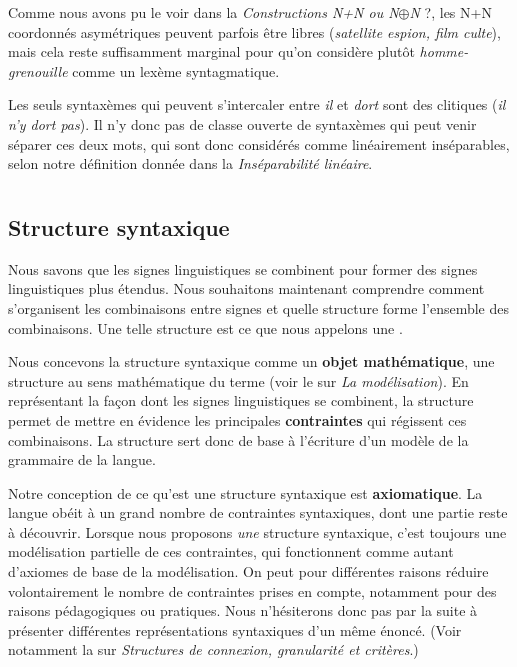 {     Comme nous avons pu le voir dans la  \textit{Constructions N+N ou N}\textrm{\textit{${\oplus}$}}\textit{N} ?, les N+N coordonnés asymétriques peuvent parfois être libres (\textit{satellite espion, film culte}), mais cela reste suffisamment marginal pour qu’on considère plutôt \textit{homme-grenouille} comme un lexème syntagmatique.

     Les seuls syntaxèmes qui peuvent s’intercaler entre \textit{il} et \textit{dort} sont des clitiques (\textit{il n’y dort pas}). Il n’y donc pas de classe ouverte de syntaxèmes qui peut venir séparer ces deux mots, qui sont donc considérés comme linéairement inséparables, selon notre définition donnée dans la  \textit{Inséparabilité linéaire}.
}
\chapter{}\label{sec:3.2}

\section{Structure syntaxique}\label{sec:3.2.0}

Nous savons que les signes linguistiques se combinent pour former des signes linguistiques plus étendus. Nous souhaitons maintenant comprendre comment s’organisent les combinaisons entre signes et quelle structure forme l’ensemble des combinaisons. Une telle structure est ce que nous appelons une .

Nous concevons la structure syntaxique comme un \textbf{objet mathématique}, une structure au sens mathématique du terme (voir le  sur \textit{La modélisation}). En représentant la façon dont les signes linguistiques se combinent, la structure permet de mettre en évidence les principales \textbf{contraintes} qui régissent ces combinaisons. La structure sert donc de base à l’écriture d’un modèle de la grammaire de la langue.

Notre conception de ce qu’est une structure syntaxique est \textbf{axiomatique}. La langue obéit à un grand nombre de contraintes syntaxiques, dont une partie reste à découvrir. Lorsque nous proposons \textit{une} structure syntaxique, c’est toujours une modélisation partielle de ces contraintes, qui fonctionnent comme autant d’axiomes de base de la modélisation. On peut pour différentes raisons réduire volontairement le nombre de contraintes prises en compte, notamment pour des raisons pédagogiques ou pratiques. Nous n’hésiterons donc pas par la suite à présenter différentes représentations syntaxiques d’un même énoncé. (Voir notamment la  sur \textit{Structures de connexion, granularité et critères}.)

